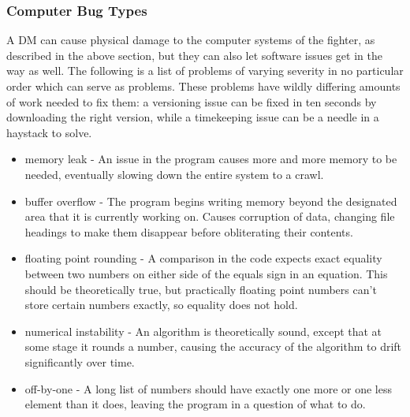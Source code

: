\documentclass[a4paper]{article}
\begin{document}
\subsubsection{Computer Bug Types} \label{fighter_computer_bug_types}

A DM can cause physical damage to the computer systems of the fighter, as described in the above section, but they can also let software issues get in the way as well. The following is a list of problems of varying severity in no particular order which can serve as problems. These problems have wildly differing amounts of work needed to fix them: a versioning issue can be fixed in ten seconds by downloading the right version, while a timekeeping issue can be a needle in a haystack to solve.

\begin{minipage}[t]{0.45\linewidth}
\begin{itemize}[leftmargin=0cm]
\item memory leak - An issue in the program causes more and more memory to be needed, eventually slowing down the entire system to a crawl.
\item buffer overflow - The program begins writing memory beyond the designated area that it is currently working on. Causes corruption of data, changing file headings to make them disappear before obliterating their contents.
\item floating point rounding - A comparison in the code expects exact equality between two numbers on either side of the equals sign in an equation. This should be theoretically true, but practically floating point numbers can't store certain numbers exactly, so equality does not hold. 
\item numerical instability - An algorithm is theoretically sound, except that at some stage it rounds a number, causing the accuracy of the algorithm to drift significantly over time.
\item off-by-one - A long list of numbers should have exactly one more or one less element than it does, leaving the program in a question of what to do. 
\end{itemize}
\end{minipage}
\end{document}
